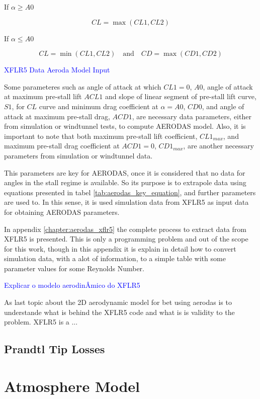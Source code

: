 If $\alpha \geq A0$

\begin{equation}
    C L=\operatorname*{max}(CL1, CL2)
\end{equation}

If $\alpha \leq A0$

\begin{equation}
    CL = \operatorname*{min}(CL1 , CL2) \quad \text{and} \quad CD = \operatorname*{max}(CD1, CD2)
\end{equation}


\textcolor{blue}{XFLR5 Data  Aeroda Model  Input}

Some parameteres such as  angle of attack at which $CL1 = 0$, $A0$, angle of attack at maximum pre-stall lift $ACL1$ and slope of linear segment of pre-stall lift curve, $S1$, for $CL$ curve and minimum drag coefficient at $\alpha = A0$, $CD0$, and angle of attack at maximum pre-stall drag, $ACD1$, are necessary data parameters, either from simulation or windtunnel tests, to compute AERODAS model. Also, it is important to note that both maximum pre-stall lift coefficient, $CL1_{max}$, and maximum pre-stall drag coefficient at $ACD1 = 0$,  $CD1_{max}$, are another necessary parameters from simulation or windtunnel data.

This parameters are key for AERODAS, once it is considered that no data for angles in the stall regime is available. So its purpose is to extrapole data using  equations presented in tabel \ref{tab:aerodas_key_equation}, and further parameters are used to. In this sense, it is used simulation data from XFLR5 as input data for obtaining AERODAS parameters.

In appendix \ref{chapter:aerodas_xflr5} the complete process to extract data from XFLR5 is presented. This is only a programming problem and out of the scope for this work, though in this appendix it is explain in detail how to convert simulation data, with a alot of information, to a simple table with some parameter values for some Reynolds Number.

\textcolor{blue}{Explicar o modelo aerodinÂmico do XFLR5}

As last topic about the 2D aerodynamic model for \gls{bet} using aerodas is to understande what is behind the XFLR5 code and what is is validity to the problem. XFLR5 is a ...

\subsection{Prandtl Tip Losses}
\label{section:prandtl_tip}


\section{Atmosphere Model}
\label{section:atmosphere_model}
